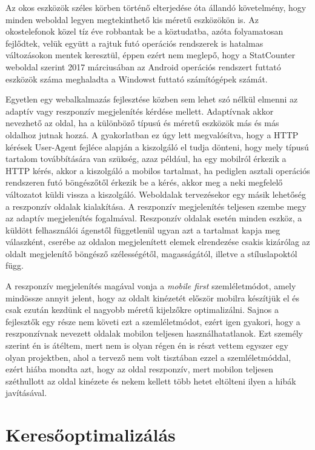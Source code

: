 \documentclass[hidelinks, 12pt, a4paper]{report}
\begin{document}
Az okos eszközök széles körben történő elterjedése óta állandó követelmény, hogy minden weboldal legyen megtekinthető kis méretű eszközökön is. Az okostelefonok közel tíz éve robbantak be a köztudatba, azóta folyamatosan fejlődtek, velük együtt a rajtuk futó operációs rendszerek is hatalmas változásokon mentek keresztül, éppen ezért nem meglepő, hogy a StatCounter \cite{statcounter} weboldal szerint 2017 márciusában az Android operációs rendszert futtató eszközök száma meghaladta a Windowst futtató számítógépek számát.

Egyetlen egy webalkalmazás fejlesztése közben sem lehet szó nélkül elmenni az adaptív vagy reszponzív megjelenítés kérdése mellett. Adaptívnak akkor nevezhető az oldal, ha a különböző típusú és méretű eszközök más és más oldalhoz jutnak hozzá. A gyakorlatban ez úgy lett megvalósítva, hogy a HTTP kérések User-Agent fejléce alapján a kiszolgáló el tudja dönteni, hogy mely típusú tartalom továbbítására van szükség, azaz például, ha egy mobilról érkezik a HTTP kérés, akkor a kiszolgáló a mobilos tartalmat, ha pediglen asztali operációs rendszeren futó böngészőtől érkezik be a kérés, akkor meg a neki megfelelő változatot küldi vissza a kiszolgáló. Weboldalak tervezésekor egy másik lehetőség a reszponzív oldalak kialakítása. A reszponzív megjelenítés teljesen szembe megy az adaptív megjelenítés fogalmával. Reszponzív oldalak esetén minden eszköz, a küldött felhasználói ágenstől függetlenül ugyan azt a tartalmat kapja meg válaszként, cserébe az oldalon megjelenített elemek elrendezése csakis kizárólag az oldalt megjelenítő böngésző szélességétől, magasságától, illetve a stíluslapoktól függ.

A reszponzív megjelenítés magával vonja a \emph{mobile first} szemléletmódot, amely mindössze annyit jelent, hogy az oldalt kinézetét először mobilra készítjük el és csak ezután kezdünk el nagyobb méretű kijelzőkre optimalizálni. Sajnos a fejlesztők egy része nem követi ezt a szemléletmódot, ezért igen gyakori, hogy a reszponzívnak nevezett oldalak mobilon teljesen használhatatlanok. Ezt személy szerint én is átéltem, mert nem is olyan régen én is részt vettem egyszer egy olyan projektben, ahol a tervező nem volt tisztában ezzel a szemléletmóddal, ezért hiába mondta azt, hogy az oldal reszponzív, mert mobilon teljesen széthullott az oldal kinézete és nekem kellett több hetet eltölteni ilyen a hibák javításával.


\section{Keresőoptimalizálás}
\end{document}

